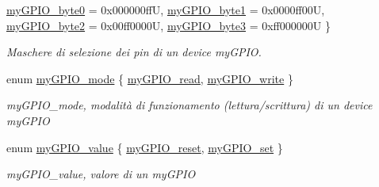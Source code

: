 \begin{DoxyCompactItemize}
\hyperlink{group__bare-metal_gga402a0d20afc0cb7c25554b8b023f4253a0347b1742eef6b2575a7d409c7fb5c3d}{my\+G\+P\+I\+O\+\_\+byte0} = 0x000000ff\+U, 
\hyperlink{group__bare-metal_gga402a0d20afc0cb7c25554b8b023f4253ae5aec65fa20f554b893e419fc2755fd0}{my\+G\+P\+I\+O\+\_\+byte1} = 0x0000ff00\+U, 
\hyperlink{group__bare-metal_gga402a0d20afc0cb7c25554b8b023f4253af4892f7db28c64a7cf2a7236c88b742b}{my\+G\+P\+I\+O\+\_\+byte2} = 0x00ff0000\+U, 
\hyperlink{group__bare-metal_gga402a0d20afc0cb7c25554b8b023f4253a1ceefb9d65397352e986c573984d0129}{my\+G\+P\+I\+O\+\_\+byte3} = 0xff000000\+U
 \}
\begin{DoxyCompactList}\small\item\em Maschere di selezione dei pin di un device my\+G\+P\+I\+O. \end{DoxyCompactList}\item 
enum \hyperlink{group__bare-metal_ga76b849f0e0c05e7f9161bdb33396f2b1}{my\+G\+P\+I\+O\+\_\+mode} \{ \hyperlink{group__bare-metal_gga76b849f0e0c05e7f9161bdb33396f2b1a1e6dc78e7641e878cadc842d39605d5d}{my\+G\+P\+I\+O\+\_\+read}, 
\hyperlink{group__bare-metal_gga76b849f0e0c05e7f9161bdb33396f2b1a2d66976280eb7595a42c631683bdfad6}{my\+G\+P\+I\+O\+\_\+write}
 \}
\begin{DoxyCompactList}\small\item\em my\+G\+P\+I\+O\+\_\+mode, modalità di funzionamento (lettura/scrittura) di un device my\+G\+P\+I\+O \end{DoxyCompactList}\item 
enum \hyperlink{group__bare-metal_gaf634fe4a0e1eab8da5000b72d6ad362b}{my\+G\+P\+I\+O\+\_\+value} \{ \hyperlink{group__bare-metal_ggaf634fe4a0e1eab8da5000b72d6ad362ba98cde80dbda025bd1ae7231c76b55674}{my\+G\+P\+I\+O\+\_\+reset}, 
\hyperlink{group__bare-metal_ggaf634fe4a0e1eab8da5000b72d6ad362ba10d296f3711d01189cc6c2d87f7c9149}{my\+G\+P\+I\+O\+\_\+set}
 \}
\begin{DoxyCompactList}\small\item\em my\+G\+P\+I\+O\+\_\+value, valore di un my\+G\+P\+I\+O \end{DoxyCompactList}\end{DoxyCompactItemize}
